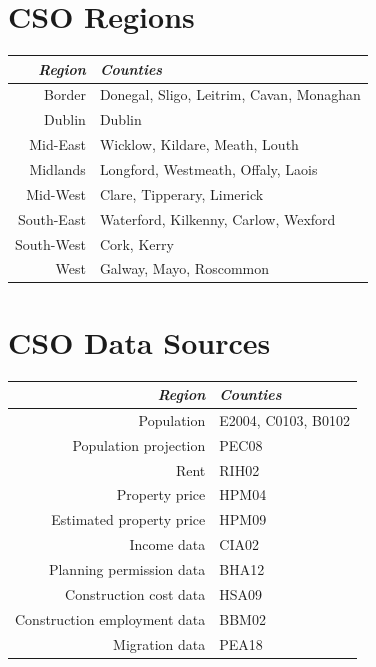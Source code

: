 \documentclass[twocolumn]{article}
\begin{document}
\section{CSO Regions\label{a:regions}}
\begin{tabularx}{0.5\textwidth}{r X}
    \textit{Region} & \textit{Counties} \\ \hline
    Border & Donegal, Sligo, Leitrim, Cavan, Monaghan\\ \hline
    Dublin & Dublin\\ \hline
    Mid-East & Wicklow, Kildare, Meath, Louth\\ \hline
    Midlands & Longford, Westmeath, Offaly, Laois\\ \hline
    Mid-West & Clare, Tipperary, Limerick\\ \hline
    South-East & Waterford, Kilkenny, Carlow, Wexford\\ \hline
    South-West & Cork, Kerry\\ \hline
    West & Galway, Mayo, Roscommon
\end{tabularx}
\section{CSO Data Sources\label{a:sources}}
\begin{tabularx}{0.5\textwidth}{r X}
    \textit{Region} & \textit{Counties} \\ \hline
    Population & E2004, C0103, B0102 \\ \hline
    Population projection & PEC08 \\ \hline
    Rent & RIH02 \\ \hline
    Property price & HPM04  \\ \hline
    Estimated property price & HPM09 \\ \hline
    Income data & CIA02 \\ \hline
    Planning permission data & BHA12 \\ \hline
    Construction cost data & HSA09 \\ \hline
    Construction employment data & BBM02 \\ \hline
    Migration data & PEA18
\end{tabularx}
\end{document}
